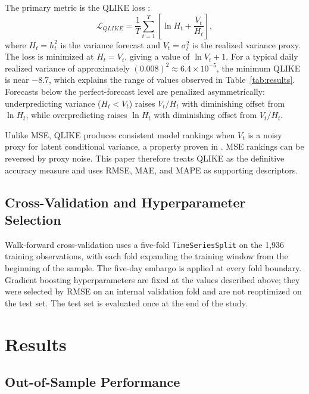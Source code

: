 \documentclass[12pt]{article}
\begin{document}
The primary metric is the QLIKE loss \citep{Patton2011}:
\begin{equation}
  \mathcal{L}_{QLIKE} = \frac{1}{T}\sum_{t=1}^{T}
    \left[\ln H_{t} + \frac{V_{t}}{H_{t}}\right],
  \label{eq:qlike}
\end{equation}
where $H_{t} = h_{t}^{2}$ is the variance forecast and $V_{t} = \sigma_{t}^{2}$
is the realized variance proxy.  The loss is minimized at $H_{t} = V_{t}$,
giving a value of $\ln V_{t} + 1$.  For a typical daily realized variance of
approximately $(0.008)^{2} \approx 6.4 \times 10^{-5}$, the minimum QLIKE is
near $-8.7$, which explains the range of values observed in
Table~\ref{tab:results}.  Forecasts below the perfect-forecast level are
penalized asymmetrically: underpredicting variance ($H_{t} < V_{t}$) raises
$V_{t}/H_{t}$ with diminishing offset from $\ln H_{t}$, while overpredicting
raises $\ln H_{t}$ with diminishing offset from $V_{t}/H_{t}$.

Unlike MSE, QLIKE produces consistent model rankings when $V_{t}$ is a noisy
proxy for latent conditional variance, a property proven in
\citet{Patton2011}.  MSE rankings can be reversed by proxy noise.  This paper
therefore treats QLIKE as the definitive accuracy measure and uses RMSE,
MAE, and MAPE as supporting descriptors.

\subsection{Cross-Validation and Hyperparameter Selection}

Walk-forward cross-validation uses a five-fold \texttt{TimeSeriesSplit} on
the 1,936 training observations, with each fold expanding the training window
from the beginning of the sample.  The five-day embargo is applied at every
fold boundary.  Gradient boosting hyperparameters are fixed at the values
described above; they were selected by RMSE on an internal validation fold
and are not reoptimized on the test set.  The test set is evaluated once at
the end of the study.


\section{Results}
\label{sec:results}

\subsection{Out-of-Sample Performance}
\end{document}
